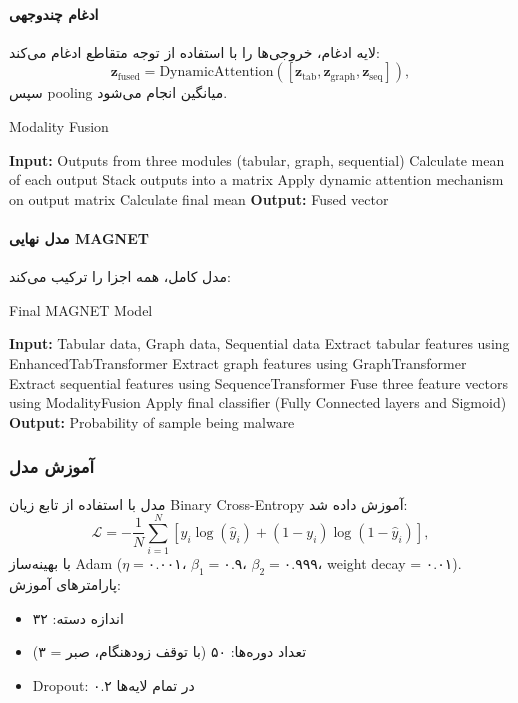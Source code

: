 \paragraph{ادغام چندوجهی}
لایه ادغام، خروجی‌ها را با استفاده از توجه متقاطع ادغام می‌کند:
\[
\mathbf{z}_{\text{fused}} = \text{DynamicAttention}([\mathbf{z}_{\text{tab}}, \mathbf{z}_{\text{graph}}, \mathbf{z}_{\text{seq}}]),
\]
سپس pooling میانگین انجام می‌شود.
\begin{LTR}
\begin{algorithm}[h]
\caption{Modality Fusion}
\begin{algorithmic}[1]
\STATE \textbf{Input:} Outputs from three modules (tabular, graph, sequential)
\STATE Calculate mean of each output
\STATE Stack outputs into a matrix
\STATE Apply dynamic attention mechanism on output matrix
\STATE Calculate final mean
\STATE \textbf{Output:} Fused vector
\end{algorithmic}
\end{algorithm}
\end{LTR}

\paragraph{مدل نهایی MAGNET}
مدل کامل، همه اجزا را ترکیب می‌کند:
\begin{LTR}
\begin{algorithm}[h]
\caption{Final MAGNET Model}
\begin{algorithmic}[1]
\STATE \textbf{Input:} Tabular data, Graph data, Sequential data
\STATE Extract tabular features using EnhancedTabTransformer
\STATE Extract graph features using GraphTransformer
\STATE Extract sequential features using SequenceTransformer
\STATE Fuse three feature vectors using ModalityFusion
\STATE Apply final classifier (Fully Connected layers and Sigmoid)
\STATE \textbf{Output:} Probability of sample being malware
\end{algorithmic}
\end{algorithm}
\end{LTR}

\subsubsection{آموزش مدل}
مدل با استفاده از تابع زیان Binary Cross-Entropy آموزش داده شد:
\[
\mathcal{L} = -\frac{1}{N} \sum_{i=1}^N [y_i \log(\hat{y}_i) + (1 - y_i) \log(1 - \hat{y}_i)],
\]
با بهینه‌ساز Adam (\( \eta = ۰.۰۰۱ \)، \( \beta_1 = ۰.۹ \)، \( \beta_2 = ۰.۹۹۹ \)، {weight decay = ۰.۰۱}). پارامترهای آموزش:
\begin{itemize}
    \item اندازه دسته: ۳۲
    \item تعداد دوره‌ها: ۵۰ (با توقف زودهنگام، صبر = ۳)
    \item Dropout: ۰.۲ در تمام لایه‌ها
\end{itemize}

